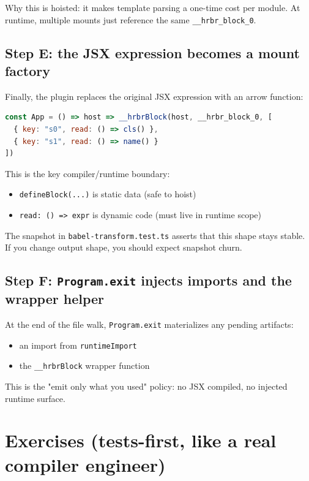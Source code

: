 Why this is hoisted: it makes template parsing a one-time cost per module.
At runtime, multiple mounts just reference the same \texttt{\_\_hrbr\_block\_0}.

\subsection{Step E: the JSX expression becomes a mount factory}

Finally, the plugin replaces the original JSX expression with an arrow function:

\begin{lstlisting}[language=JavaScript]
const App = () => host => __hrbrBlock(host, __hrbr_block_0, [
  { key: "s0", read: () => cls() },
  { key: "s1", read: () => name() }
])
\end{lstlisting}

This is the key compiler/runtime boundary:

\begin{itemize}
\item \texttt{defineBlock(...)} is static data (safe to hoist)
\item \texttt{read: () => expr} is dynamic code (must live in runtime scope)
\end{itemize}

The snapshot in \texttt{babel-transform.test.ts} asserts that this shape stays stable.
If you change output shape, you should expect snapshot churn.

\subsection{Step F: \texttt{Program.exit} injects imports and the wrapper helper}

At the end of the file walk, \texttt{Program.exit} materializes any pending artifacts:

\begin{itemize}
\item an import from \texttt{runtimeImport}
\item the \texttt{\_\_hrbrBlock} wrapper function
\end{itemize}

This is the "emit only what you used" policy: no JSX compiled, no injected runtime surface.

\section{Exercises (tests-first, like a real compiler engineer)}

